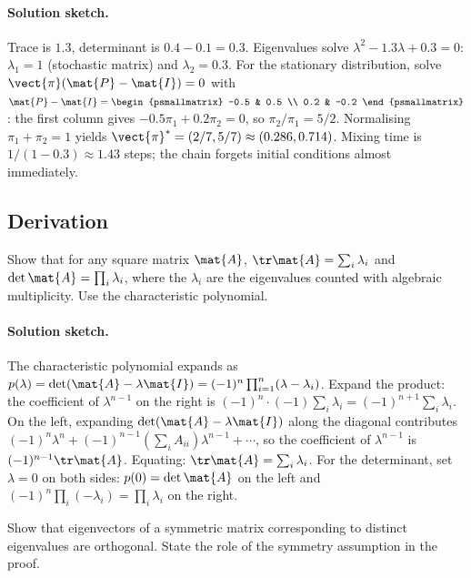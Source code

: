 \paragraph{Solution sketch.}
Trace is $1.3$, determinant is $0.4 - 0.1 = 0.3$. Eigenvalues solve
$\lambda^{2} - 1.3\lambda + 0.3 = 0$: $\lambda_{1} = 1$ (stochastic
matrix) and $\lambda_{2} = 0.3$. For the stationary distribution,
solve $\vect{\pi}(\mat{P} - \mat{I}) = 0$ with
$\mat{P} - \mat{I} = \begin{psmallmatrix} -0.5 & 0.5 \\ 0.2 & -0.2
\end{psmallmatrix}$: the first column gives $-0.5\pi_{1} + 0.2\pi_{2}
= 0$, so $\pi_{2}/\pi_{1} = 5/2$. Normalising $\pi_{1} + \pi_{2} = 1$
yields $\vect{\pi}^{*} = (2/7, 5/7) \approx (0.286, 0.714)$. Mixing
time is $1/(1 - 0.3) \approx 1.43$ steps; the chain forgets initial
conditions almost immediately.

\subsection*{Derivation}

\begin{exercise}
Show that for any square matrix $\mat{A}$, $\tr \mat{A} = \sum_{i}
\lambda_{i}$ and $\det \mat{A} = \prod_{i} \lambda_{i}$, where the
$\lambda_{i}$ are the eigenvalues counted with algebraic multiplicity.
Use the characteristic polynomial.
\end{exercise}

\paragraph{Solution sketch.}
The characteristic polynomial expands as $p(\lambda) = \det(\mat{A} -
\lambda \mat{I}) = (-1)^{n} \prod_{i=1}^{n}(\lambda - \lambda_{i})$.
Expand the product: the coefficient of $\lambda^{n-1}$ on the right
is $(-1)^{n} \cdot (-1) \sum_{i} \lambda_{i} = (-1)^{n+1}
\sum_{i}\lambda_{i}$. On the left, expanding $\det(\mat{A} -
\lambda\mat{I})$ along the diagonal contributes
$(-1)^{n} \lambda^{n} + (-1)^{n-1}(\sum_{i} A_{ii})\lambda^{n-1} +
\cdots$, so the coefficient of $\lambda^{n-1}$ is
$(-1)^{n-1} \tr \mat{A}$. Equating: $\tr \mat{A} = \sum_{i}
\lambda_{i}$. For the determinant, set $\lambda = 0$ on both sides:
$p(0) = \det \mat{A}$ on the left and $(-1)^{n} \prod_{i}(-\lambda_{i})
= \prod_{i} \lambda_{i}$ on the right.

\begin{exercise}
Show that eigenvectors of a symmetric matrix corresponding to
distinct eigenvalues are orthogonal. State the role of the
symmetry assumption in the proof.
\end{exercise}

